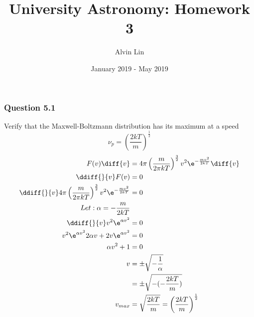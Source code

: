 \documentclass{math}
\title{University Astronomy: Homework 3}
\author{Alvin Lin}
\date{January 2019 - May 2019}
\begin{document}
\maketitle

\subsubsection*{Question 5.1}
Verify that the Maxwell-Boltzmann distribution has its maximum at a speed
\[ \nu_p = \left(\frac{2kT}{m}\right)^{\frac{1}{2}} \]
\begin{align*}
  F(v)\diff{v} &= 4\pi\left(\frac{m}{2\pi kT}\right)^{\frac{3}{2}}v^2
    \e^{-\frac{mv^2}{2kT}}\diff{v} \\
  \ddiff{}{v}F(v) &= 0 \\
  \ddiff{}{v}4\pi\left(\frac{m}{2\pi kT}\right)^{\frac{3}{2}}v^2
    \e^{-\frac{mv^2}{2kT}} &= 0 \\
  Let: \alpha = -\frac{m}{2kT} \\
  \ddiff{}{v}v^2\e^{\alpha v^2} &= 0 \\
  v^2\e^{\alpha v^2}2\alpha v +2v\e^{\alpha v^2} &= 0 \\
  \alpha v^2+1 &= 0 \\
  v &= \pm\sqrt{-\frac{1}{\alpha}} \\
  &= \pm\sqrt{-(-\frac{2kT}{m})} \\
  v_{max} &= \sqrt{\frac{2kT}{m}} = \left(\frac{2kT}{m}\right)^{\frac{1}{2}}
\end{align*}
\end{document}
